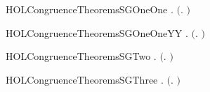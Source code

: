 \newcommand{\HOLCongruenceTheoremsSGOneZero}{\UseVerbatim{HOLCongruenceTheoremsSGOneZero}}
\begin{SaveVerbatim}{HOLCongruenceTheoremsSGOneOne}
\HOLTokenTurnstile{} \HOLSymConst{\HOLTokenForall{}}  .  \ensuremath{(}\HOLTokenLambda{}. \HOLConst{\ensuremath{\tau}}\HOLSymConst{\ensuremath{\ldotp}}  \HOLSymConst{\ensuremath{+}}  \HOLSymConst{\ensuremath{\ldotp}} \ensuremath{)} \HOLSymConst{\HOLTokenImp{}}  
\end{SaveVerbatim}
\newcommand{\HOLCongruenceTheoremsSGOneOne}{\UseVerbatim{HOLCongruenceTheoremsSGOneOne}}
\begin{SaveVerbatim}{HOLCongruenceTheoremsSGOneOneYY}
\HOLTokenTurnstile{} \HOLSymConst{\HOLTokenForall{}}  .  \ensuremath{(}\HOLTokenLambda{}.  \HOLSymConst{\ensuremath{\ldotp}}  \HOLSymConst{\ensuremath{+}} \HOLConst{\ensuremath{\tau}}\HOLSymConst{\ensuremath{\ldotp}} \ensuremath{)} \HOLSymConst{\HOLTokenImp{}}  
\end{SaveVerbatim}
\newcommand{\HOLCongruenceTheoremsSGOneOneYY}{\UseVerbatim{HOLCongruenceTheoremsSGOneOneYY}}
\begin{SaveVerbatim}{HOLCongruenceTheoremsSGTwo}
\HOLTokenTurnstile{} \HOLSymConst{\HOLTokenForall{}} .   \HOLSymConst{\HOLTokenImp{}}  \ensuremath{(}\HOLTokenLambda{}.  \HOLSymConst{\ensuremath{\ldotp}} \ensuremath{)}
\end{SaveVerbatim}
\newcommand{\HOLCongruenceTheoremsSGTwo}{\UseVerbatim{HOLCongruenceTheoremsSGTwo}}
\begin{SaveVerbatim}{HOLCongruenceTheoremsSGThree}
\HOLTokenTurnstile{} \HOLSymConst{\HOLTokenForall{}} .   \HOLSymConst{\HOLTokenImp{}}  \ensuremath{(}\HOLTokenLambda{}. \HOLSymConst{\ensuremath{\ldotp}} \ensuremath{)}
\end{SaveVerbatim}
\newcommand{\HOLCongruenceTheoremsSGThree}{\UseVerbatim{HOLCongruenceTheoremsSGThree}}
